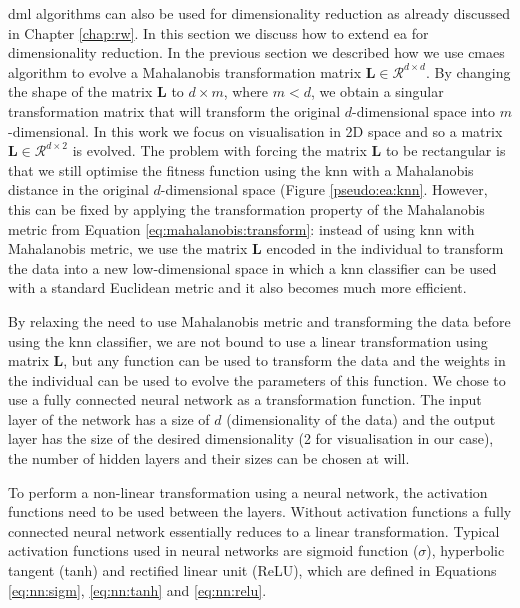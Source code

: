 \documentclass[12pt,a4paper]{report}
\begin{document}
\acl{dml} algorithms can also be used for dimensionality reduction as already discussed in Chapter \ref{chap:rw}. In this section we discuss how to extend \acl{ea} for dimensionality reduction. In the previous section we described how we use \ac{cmaes} algorithm to evolve a Mahalanobis transformation matrix $\bm{L} \in \mathcal{R}^{d\times d}$. By changing the shape of the matrix $\bm{L}$ to $d\times m$, where $m < d$, we obtain a singular transformation matrix that will transform the original $d$-dimensional space into $m$-dimensional. In this work we focus on visualisation in 2D space and so a matrix $\bm{L} \in \mathcal{R}^{d\times 2}$ is evolved. The problem with forcing the matrix $\bm{L}$ to be rectangular is that we still optimise the fitness function using the \ac{knn} with a Mahalanobis distance in the original $d$-dimensional space (Figure \ref{pseudo:ea:knn}. However, this can be fixed by applying the transformation property of the Mahalanobis metric from Equation \ref{eq:mahalanobis:transform}: instead of using \ac{knn} with Mahalanobis metric, we use the matrix $\bm{L}$ encoded in the individual to transform the data into a new low-dimensional space in which a \ac{knn} classifier can be used with a standard Euclidean metric and it also becomes much more efficient.

By relaxing the need to use Mahalanobis metric and transforming the data before using the \ac{knn} classifier, we are not bound to use a linear transformation using matrix $\bm{L}$, but any function can be used to transform the data and the weights in the individual can be used to evolve the parameters of this function. We chose to use a fully connected neural network as a transformation function. The input layer of the network has a size of $d$ (dimensionality of the data) and the output layer has the size of the desired dimensionality (2 for visualisation in our case), the number of hidden layers and their sizes can be chosen at will. 

To perform a non-linear transformation using a neural network, the activation functions need to be used between the layers. Without activation functions a fully connected neural network essentially reduces to a linear transformation. Typical activation functions used in neural networks are sigmoid function ($\sigma$), hyperbolic tangent (tanh) and rectified linear unit (ReLU), which are defined in Equations \ref{eq:nn:sigm}, \ref{eq:nn:tanh} and \ref{eq:nn:relu}.
\end{document}
